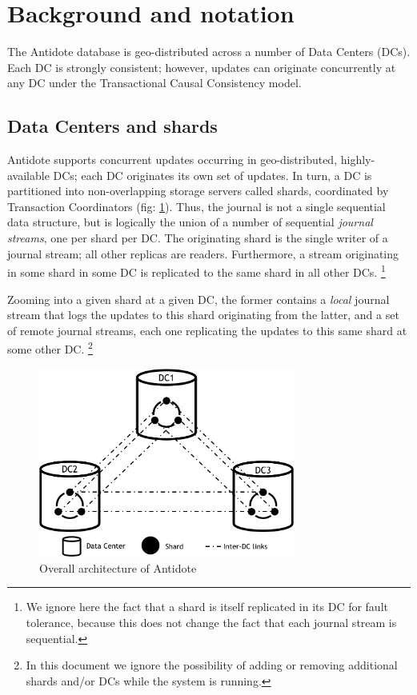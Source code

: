 \documentclass[twoside]{article}
\begin{document}
\section{Background and notation}
\label{sec:background}
The Antidote database is geo-distributed across a number of Data Centers
(DCs).
Each DC is strongly consistent; however, updates can originate
concurrently at any DC under the Transactional Causal Consistency model.

\subsection{Data Centers and shards}
\label{sec:dc-shards}
Antidote supports concurrent updates occurring in geo-distributed,
highly-available DCs; each DC originates its own set of updates.
In turn, a DC is partitioned into non-overlapping storage servers called
shards, coordinated by Transaction Coordinators (fig: \ref{fig:architecture}).
Thus, the journal is not a single sequential data structure, but is
logically the union of a number of sequential \emph{journal streams},
one per shard per DC\@.
The originating shard is the single writer of a journal stream; all 
other replicas are readers.
Furthermore, a stream originating in some shard in some DC is replicated
to the same shard in all other DCs.%
%
\footnote{
%
  We ignore here the fact that a shard is itself replicated in its DC
  for fault tolerance, because this does not change the fact that each
  journal stream is sequential.
}
%

Zooming into a given shard at a given DC, the former contains a \emph{local}
journal stream that logs the updates to this shard originating from the latter,
and a set of remote journal streams, each one replicating the
updates to this same shard at some other DC\@.
%
\footnote{
  In this document we ignore the possibility of adding or removing additional shards 
  and/or DCs while the system is running. 
}

\begin{figure}[tp]
  \centering
  \includegraphics[width=0.75\textwidth]{figures/datacentres.png}
  \caption{Overall architecture of Antidote}
  \label{fig:architecture}
\end{figure}
\end{document}
